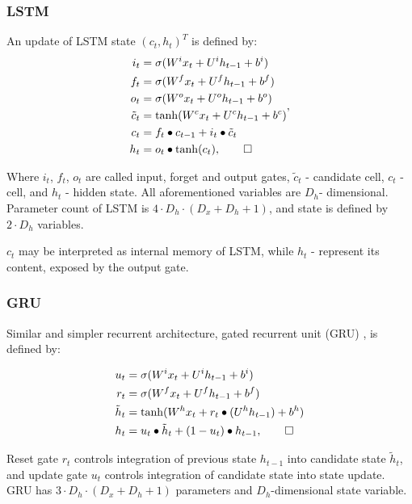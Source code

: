 \documentclass[a4paper,11pt]{article}
\begin{document}
\subsubsection{LSTM}

An update of LSTM state $(c_{t}, h_{t})^{T}$ is defined by:
\begin{align}
\begin{split}
\label{LSTM}
i_{t} &=\sigma(W^{i}x_{t} + U^{i}h_{t-1} + b^{i})\\
f_{t} &=\sigma(W^{f}x_{t} + U^{f}h_{t-1} + b^{f})\\
o_{t} &=\sigma(W^{o}x_{t} + U^{o}h_{t-1} + b^{o})\\
\tilde{c}_{t} &= \tanh(W^{c}x_{t} + U^{c}h_{t-1} + b^{c})\\
c_{t} &=f_{t} \bullet c_{t-1} + i_{t} \bullet \tilde{c}_{t}\\
h_{t} &=o_{t} \bullet \tanh(c_{t}), \qedhere
\end{split},
\end{align}

Where $i_{t}$, $f_{t}$, $o_{t}$ are called input, forget and output gates, $\tilde{c}_{t}$ - candidate cell, $c_{t}$ - cell, and $h_{t}$ - hidden state. All aforementioned variables are $D_{h}$- dimensional. Parameter count of LSTM is 
$4 \cdot D_{h} \cdot (D_{x}  + D_{h} + 1)$, and state is defined by $2 \cdot D_{h}$ variables.

$c_{t}$ may be interpreted as internal memory of LSTM, while $h_{t}$ - represent its content, exposed by the output gate.  

\subsubsection{GRU}
Similar and simpler recurrent architecture, gated recurrent unit (GRU) \cite{Chung}, is defined by:

\begin{align}
\begin{split}
\label{LSTM}
u_{t} &=\sigma(W^{i}x_{t} + U^{i}h_{t-1} + b^{i})\\
r_{t} &=\sigma(W^{f}x_{t} + U^{f}h_{t-1} + b^{f})\\
\tilde{h}_{t} &= \tanh(W^{h}x_{t} + r_{t} \bullet (U^{h}h_{t-1}) + b^{h})\\
h_{t} &= u_{t} \bullet \tilde{h}_{t} + (1 - u_{t}) \bullet h_{t-1}, \qedhere
\end{split}
\end{align}

\noindent Reset gate $r_{t}$ controls integration of previous state $h_{t-1}$ into candidate state $\tilde{h}_{t}$, and update gate $u_{t}$ controls integration of candidate state into state update. GRU has $ 3 \cdot D_{h} \cdot (D_{x}  + D_{h} + 1) $ parameters and $D_{h}$-dimensional state variable.
\end{document}
